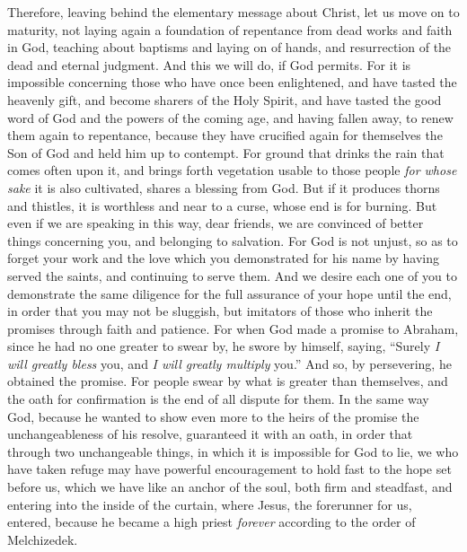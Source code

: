 \begin{biblechapter} %
 Therefore, leaving behind the elementary message about Christ, let us move on to maturity, not laying again a foundation of repentance from dead works and faith in God,
\verse teaching about baptisms and laying on of hands, and resurrection of the dead and eternal judgment.
\verse And this we will do, if God permits.
\verse For it is impossible concerning those who have once been enlightened, and have tasted the heavenly gift, and become sharers of the Holy Spirit,
\verse and have tasted the good word of God and the powers of the coming age,
\verse and having fallen away, to renew them again to repentance, because they have crucified again for themselves the Son of God and held him up to contempt.
\verse For ground that drinks the rain that comes often upon it, and brings forth vegetation usable to those people \textit{for whose sake} it is also cultivated, shares a blessing from God.
\verse But if it produces thorns and thistles, it is worthless and near to a curse, whose end is for burning.
\verse But even if we are speaking in this way, dear friends, we are convinced of better things concerning you, and belonging to salvation.
\verse For God is not unjust, so as to forget your work and the love which you demonstrated for his name by having served the saints, and continuing to serve them.
\verse And we desire each one of you to demonstrate the same diligence for the full assurance of your hope until the end,
\verse in order that you may not be sluggish, but imitators of those who inherit the promises through faith and patience.
 For when God made a promise to Abraham, since he had no one greater to swear by, he swore by himself,
\verse saying, “Surely \textit{I will greatly bless} you, and \textit{I will greatly multiply} you.”
\verse And so, by persevering, he obtained the promise.
\verse For people swear by what is greater than themselves, and the oath for confirmation is the end of all dispute for them.
\verse In the same way God, because he wanted to show even more to the heirs of the promise the unchangeableness of his resolve, guaranteed it with an oath,
\verse in order that through two unchangeable things, in which it is impossible for God to lie, we who have taken refuge may have powerful encouragement to hold fast to the hope set before us,
\verse which we have like an anchor of the soul, both firm and steadfast, and entering into the inside of the curtain,
\verse where Jesus, the forerunner for us, entered, because he became a high priest \textit{forever} according to the order of Melchizedek.
\end{biblechapter}

